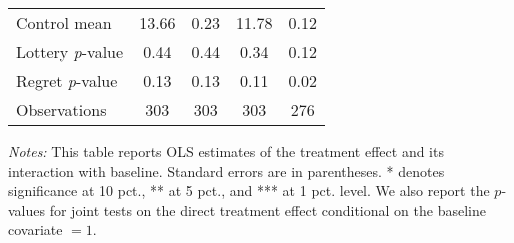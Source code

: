 \begin{table}[htbp]
{\begin{threeparttable}
\begin{tabular}{l*{4}{c}}
Control mean    &    13.66         &     0.23         &    11.78         &     0.12         \\
Lottery \emph{p}-value&     0.44         &     0.44         &     0.34         &     0.12         \\
Regret \emph{p}-value&     0.13         &     0.13         &     0.11         &     0.02         \\
Observations    &      303         &      303         &      303         &      276         \\
\bottomrule \end{tabular} \begin{tablenotes}[flushleft] \footnotesize \item \emph{Notes:} This table reports OLS estimates of the treatment effect and its interaction with baseline. Standard errors are in parentheses. * denotes significance at 10 pct., ** at 5 pct., and *** at 1 pct. level. We also report the \(p\)-values for joint tests on the direct treatment effect conditional on the baseline covariate $= 1$. \end{tablenotes} \end{threeparttable} } \end{table}

